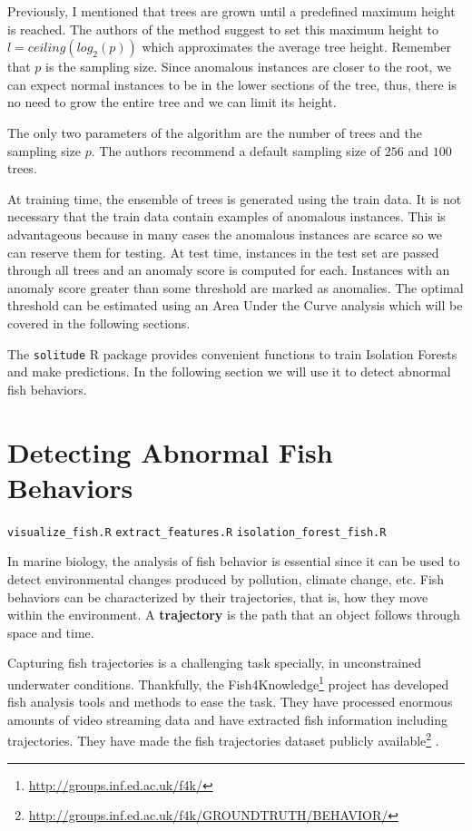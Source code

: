 \documentclass[
  11pt,
]{krantz}
\makeatletter
\newenvironment{kframe}{%
\medskip{}
\setlength{\fboxsep}{.8em}
 \def\at@end@of@kframe{}%
 \ifinner\ifhmode%
  \def\at@end@of@kframe{\end{minipage}}%
  \begin{minipage}{\columnwidth}%
 \fi\fi%
 \def\FrameCommand##1{\hskip\@totalleftmargin \hskip-\fboxsep
 \colorbox{shadecolor}{##1}\hskip-\fboxsep
     \hskip-\linewidth \hskip-\@totalleftmargin \hskip\columnwidth}%
 \MakeFramed {\advance\hsize-\width
   \@totalleftmargin\z@ \linewidth\hsize
   \@setminipage}}%
 {\par\unskip\endMakeFramed%
 \at@end@of@kframe}
\newenvironment{rmdblock}[1]
  {
  \begin{itemize}
  \renewcommand{\labelitemi}{
    \raisebox{-.7\height}[0pt][0pt]{
      {\setkeys{Gin}{width=3em,keepaspectratio}\texttt{[image: images/icons/\#1]}}
    }
  }
  \setlength{\fboxsep}{1em}
  \begin{kframe}
  \item
  }
  {
  \end{kframe}
  \end{itemize}
  }
\newenvironment{rmdfolder}
  {\begin{rmdblock}{folder}}
  {\end{rmdblock}}
\makeatother
\begin{document}
Previously, I mentioned that trees are grown until a predefined maximum height is reached. The authors of the method suggest to set this maximum height to \(l=ceiling(log_2(p))\) which approximates the average tree height. Remember that \(p\) is the sampling size. Since anomalous instances are closer to the root, we can expect normal instances to be in the lower sections of the tree, thus, there is no need to grow the entire tree and we can limit its height.

The only two parameters of the algorithm are the number of trees and the sampling size \(p\). The authors recommend a default sampling size of \(256\) and \(100\) trees.

At training time, the ensemble of trees is generated using the train data. It is not necessary that the train data contain examples of anomalous instances. This is advantageous because in many cases the anomalous instances are scarce so we can reserve them for testing. At test time, instances in the test set are passed through all trees and an anomaly score is computed for each. Instances with an anomaly score greater than some threshold are marked as anomalies. The optimal threshold can be estimated using an Area Under the Curve analysis which will be covered in the following sections.

The \texttt{solitude} R package \citep{solitude} provides convenient functions to train Isolation Forests and make predictions. In the following section we will use it to detect abnormal fish behaviors.

\hypertarget{detecting-abnormal-fish-behaviors}{%
\section{Detecting Abnormal Fish Behaviors}\label{detecting-abnormal-fish-behaviors}}

\begin{rmdfolder}
\texttt{visualize\_fish.R} \texttt{extract\_features.R} \texttt{isolation\_forest\_fish.R}
\end{rmdfolder}

In marine biology, the analysis of fish behavior is essential since it can be used to detect environmental changes produced by pollution, climate change, etc. Fish behaviors can be characterized by their trajectories, that is, how they move within the environment. A \textbf{trajectory} is the path that an object follows through space and time.

Capturing fish trajectories is a challenging task specially, in unconstrained underwater conditions. Thankfully, the Fish4Knowledge\footnote{\url{http://groups.inf.ed.ac.uk/f4k/}} project has developed fish analysis tools and methods to ease the task. They have processed enormous amounts of video streaming data and have extracted fish information including trajectories. They have made the fish trajectories dataset publicly available\footnote{\url{http://groups.inf.ed.ac.uk/f4k/GROUNDTRUTH/BEHAVIOR/}} \citep{Beyan2013}.
\end{document}
